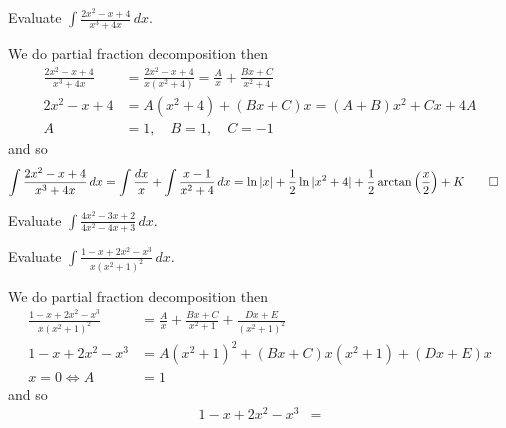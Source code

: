 \begin{problem}
    Evaluate \(\displaystyle{\int\frac{2x^2-x+4}{x^3+4x}\,dx}\).
\end{problem}
\begin{solution}
    We do partial fraction decomposition then
    \begin{align*}
        \frac{2x^2-x+4}{x^3+4x} &= \frac{2x^2-x+4}{x(x^2+4)}
        =\frac{A}{x}+\frac{Bx+C}{x^2+4} \\
        2x^2-x+4 &= A(x^2+4)+(Bx+C)x=(A+B)x^2+Cx+4A \\
        A &=1,\quad B=1,\quad C=-1
    \end{align*}
    and so
    \begin{align*}
        \int\frac{2x^2-x+4}{x^3+4x}\,dx
        &= \int\frac{dx}{x}+\int\frac{x-1}{x^2+4}\,dx
        =\ln|x|+\frac{1}{2}\ln|x^2+4|
        +\frac{1}{2}\arctan\left(\frac{x}{2}\right)+K \qedhere
    \end{align*}
\end{solution}
\begin{problem}
    Evaluate \(\displaystyle{\int\frac{4x^2-3x+2}{4x^2-4x+3}\,dx}\).
\end{problem}
\begin{solution}
    
\end{solution}
\begin{problem}
    Evaluate \(\displaystyle{\int\frac{1-x+2x^2-x^3}{x(x^2+1)^2}\,dx}\).
\end{problem}
\begin{solution}
    We do partial fraction decomposition then
    \begin{align*}
        \frac{1-x+2x^2-x^3}{x(x^2+1)^2}
        &= \frac{A}{x}+\frac{Bx+C}{x^2+1}+\frac{Dx+E}{(x^2+1)^2} \\
        1-x+2x^2-x^3 &= A(x^2+1)^2+(Bx+C)x(x^2+1)+(Dx+E)x \\
        x=0\iff A&=1
    \end{align*}
    and so
    \begin{align*}
        1-x+2x^2-x^3 &=
    \end{align*}
\end{solution}